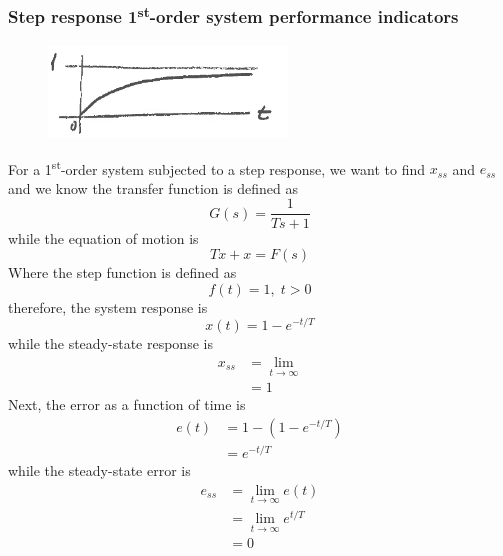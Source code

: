 \documentclass[12pt,letter]{article}
\begin{document}
\subsubsection{Step response 1\textsuperscript{st}-order system performance indicators}

\begin{figure}[H]
	\centering
	\includegraphics[width=2.5in]{../figures/step_response_with_steady_state_error}
\end{figure}



For a 1\textsuperscript{st}-order system subjected to a step response, we want to find $x_{ss}$ and $e_{ss}$ and we know the transfer function is defined as  
\begin{equation}
G(s) = \frac{1}{T s + 1}
\end{equation}
while the equation of motion is
\begin{equation}
T \dot{x} + x = F(s)
\end{equation}
Where the step function is defined as
\begin{equation}
f(t) =1, \; t > 0
\end{equation}
therefore, the system response is
\begin{equation}
x(t) =1-e^{-t/T} 
\end{equation}
while the steady-state response is
\begin{align}
x_{ss} &= \lim\limits_{t \rightarrow \infty} \\
&= 1 \nonumber
\end{align}
Next, the error as a function of time is 
\begin{align}
e(t) &= 1-(1-e^{-t/T}) \\
&= e^{-t/T} \nonumber
\end{align}
while the steady-state error is
\begin{align}
e_{ss} &= \lim\limits_{t \rightarrow \infty}e(t) \\
&= \lim\limits_{t \rightarrow \infty}e^{t/T}  \nonumber \\
&= 0 \nonumber
\end{align}
\end{document}

